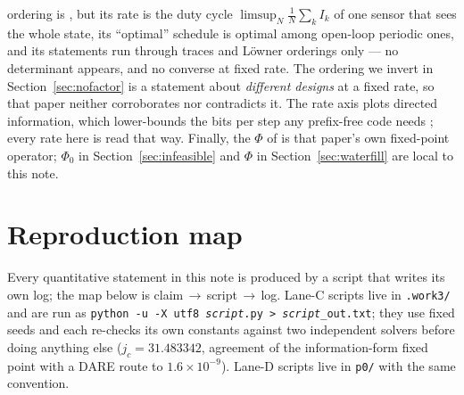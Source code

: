 \documentclass[journal]{IEEEtran}
\theoremstyle{remark}
\begin{document}
ordering is \cite{shi2012scheduling}, but its rate is the duty cycle
$\limsup_N\frac1N\sum_k I_k$ of one sensor that sees the whole state, its ``optimal''
schedule is optimal among open-loop periodic ones, and its statements run through
traces and L\"owner orderings only --- no determinant appears, and no converse at
fixed rate. The ordering we invert in Section~\ref{sec:nofactor} is a statement about
\emph{different designs} at a fixed rate, so that paper neither corroborates nor
contradicts it. The rate axis plots directed information, which lower-bounds the bits per step any
prefix-free code needs \cite{tanaka2016prefix}; every rate here is read that way.
Finally, the $\Phi$ of \cite{pacelli2026limits} is that paper's own
fixed-point operator; $\Phi_0$ in Section~\ref{sec:infeasible} and $\Phi$ in
Section~\ref{sec:waterfill} are local to this note.
\appendix
\section{Reproduction map}\label{app:repro}

Every quantitative statement in this note is produced by a script that writes its
own log; the map below is claim\,$\to$\,script\,$\to$\,log. Lane-C scripts live in
\texttt{.work3/} and are run as
\texttt{python -u -X utf8 \emph{script}.py > \emph{script}\_out.txt}; they use
fixed seeds and each re-checks its own constants against two independent solvers
before doing anything else ($j_c=31.483342$, agreement of the information-form
fixed point with a DARE route to $1.6\times10^{-9}$). Lane-D scripts live in
\texttt{p0/} with the same convention.
\end{document}
